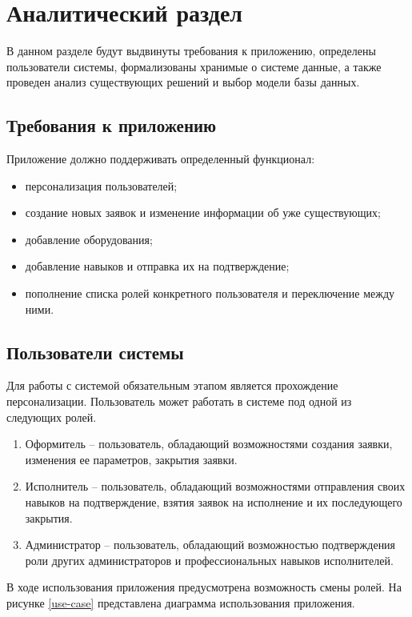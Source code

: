 \chapter{Аналитический раздел}

В данном разделе будут выдвинуты требования к приложению, определены пользователи системы, формализованы хранимые о системе данные, а также проведен анализ существующих решений и выбор модели базы данных.

\section{Требования к приложению}

Приложение должно поддерживать определенный функционал:
\begin{itemize}
	\item персонализация пользователей;
	\item создание новых заявок и изменение информации об уже существующих;
	\item добавление оборудования;
	\item добавление навыков и отправка их на подтверждение;
	\item пополнение списка ролей конкретного пользователя и переключение между ними.
\end{itemize}

\section{Пользователи системы}

Для работы с системой обязательным этапом является прохождение персонализации. Пользователь может работать в системе под одной из следующих ролей.
\begin{enumerate}
	\item Оформитель -- пользователь, обладающий возможностями создания заявки, изменения ее параметров, закрытия заявки.
	\item Исполнитель -- пользователь, обладающий возможностями отправления своих навыков на подтверждение, взятия заявок на исполнение и их последующего закрытия.
	\item Администратор -- пользователь, обладающий возможностью подтверждения роли других администраторов и профессиональных навыков исполнителей.
\end{enumerate}
В ходе использования приложения предусмотрена возможность смены ролей.
На рисунке \ref{use-case} представлена диаграмма использования приложения.

